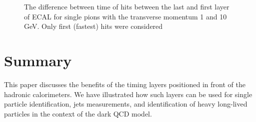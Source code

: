 \documentclass[final,1p,11pt]{elsarticle}
\begin{document}
\begin{figure}
\begin{center}
\end{center}
\caption{The difference between time of hits between the last and first layer of ECAL for single pions with the transverse momentum 1 and 10 GeV. 
Only first (fastest) hits were considered}
\label{fig:timediff}
\end{figure}



\clearpage 





%

%


\section{Summary}

This paper discusses the benefits of the timing layers positioned in front of the hadronic calorimeters.
We have illustrated how such layers can be used for single particle identification, jets measurements, and
identification of heavy long-lived particles in the context of the dark QCD model.
\end{document}
